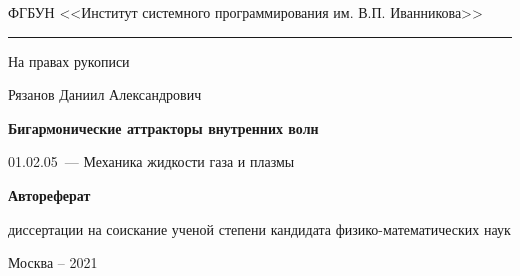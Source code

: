 \documentclass[utf8x]{G7-32} %
\begin{document}
\thispagestyle{empty}
\pagestyle{fancy}
\fancyhf{}
\fancyhead[C]{\thepage}
\renewcommand{\headrulewidth}{0pt}
{
\singlespacing
\begin{center}

ФГБУН <<Институт системного программирования им. В.П. Иванникова>>
\medskip
\hrule
\medskip
\end{center}

\vspace{20mm}
\begin{flushright}
На правах рукописи

\end{flushright}

\vspace{25mm}
\begin{center}
{\large Рязанов Даниил Александрович}
\end{center}

\vspace{5mm}
\begin{center}
{\bf \large Бигармонические аттракторы внутренних волн 
\par}

\vspace{10mm}
{
01.02.05~--- Механика жидкости газа и плазмы
}





\vspace{10mm}

{\bf \large Автореферат
\par}

\vspace{10mm}

 диссертации на соискание ученой степени кандидата физико-математических наук
\end{center}



\vfill
\begin{center}
{Москва -- 2021}
\end{center}
}
\newpage
\restoregeometry
\end{document}
